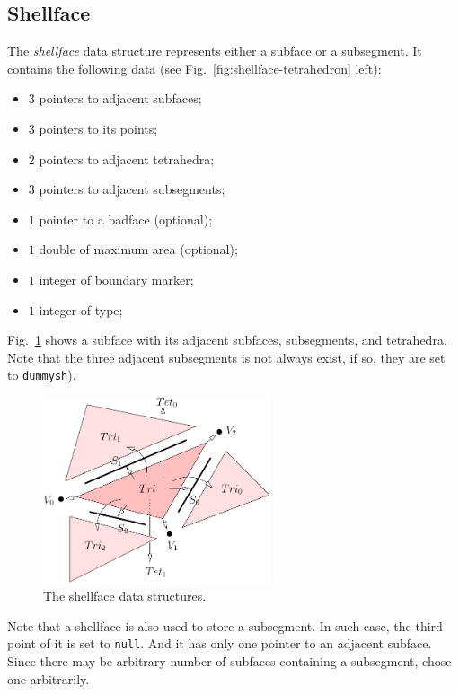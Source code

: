 \subsection{Shellface}

The {\it shellface} data structure represents either a subface or a subsegment. It contains the following data (see Fig.~\ref{fig:shellface-tetrahedron} left):
\begin{itemize}
\item $3$ pointers to adjacent subfaces;
\item $3$ pointers to its points;
\item $2$ pointers to adjacent tetrahedra;
\item $3$ pointers to adjacent subsegments;
\item $1$ pointer to a badface (optional);
\item $1$ double of maximum area (optional);
\item $1$ integer of boundary marker;
\item $1$ integer of type;
\end{itemize}

Fig.~\ref{fig:shellface} shows a subface with its adjacent subfaces, subsegments, and tetrahedra. Note that the three adjacent subsegments is not always exist, if so, they are set to {\tt dummysh}). 

\begin{figure}
  \centering
  \includegraphics[width=0.6\textwidth]{../figs/triang-edge-ds}
\caption{The shellface data structures.}
\label{fig:shellface}
\end{figure}

Note that a shellface is also used to store a subsegment. In such case, the third point of it is set to {\tt null}. And it has only one pointer to an adjacent subface.  Since there may be arbitrary number of subfaces containing a subsegment, chose one arbitrarily.

